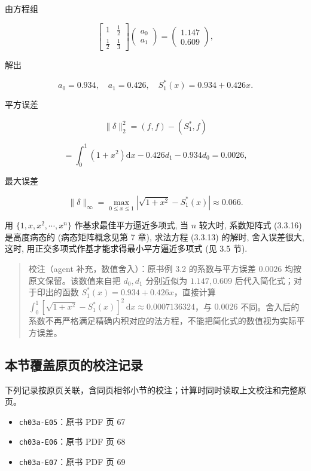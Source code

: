 \documentclass[
  10pt,
  fontset=fandol]{ctexart}
\providecommand{\tightlist}{%
  \setlength{\itemsep}{0pt}\setlength{\parskip}{0pt}}
\begin{document}
由方程组

\[
\begin{bmatrix}
1 & \frac{1}{2} \\
\frac{1}{2} & \frac{1}{3}
\end{bmatrix} \begin{pmatrix} a_0 \\ a_1 \end{pmatrix} = \begin{pmatrix} 1.147 \\ 0.609 \end{pmatrix},
\]

解出

\[
a_0 = 0.934, \quad a_1 = 0.426, \quad S_1^*(x) = 0.934 + 0.426x.
\]

平方误差

\[
\|\delta\|_2^2 = (f, f) - (S_1^*, f)
\]

\[
= \int_0^1 (1+x^2) \mathrm{d}x - 0.426 d_1 - 0.934 d_0 = 0.0026,
\]

最大误差

\[
\|\delta\|_\infty = \max_{0 \leqslant x \leqslant 1} |\sqrt{1+x^2} - S_1^*(x)| \approx 0.066.
\]

用 \(\{1, x, x^2, \cdots, x^n\}\) 作基求最佳平方逼近多项式, 当 \(n\) 较大时, 系数矩阵式 (3.3.16) 是高度病态的 (病态矩阵概念见第 7 章), 求法方程 (3.3.13) 的解时, 舍入误差很大, 这时, 用正交多项式作基才能求得最小平方逼近多项式 (见 3.5 节).

\begin{quote}
校注（agent 补充，数值舍入）：原书例 3.2 的系数与平方误差 \(0.0026\) 均按原文保留。该数值来自把 \(d_0,d_1\) 分别近似为 \(1.147,0.609\) 后代入简化式；对于印出的函数 \(S_1^*(x)=0.934+0.426x\)，直接计算 \(\int_0^1[\sqrt{1+x^2}-S_1^*(x)]^2\,\mathrm{d}x\approx0.0007136324\)，与 \(0.0026\) 不同。舍入后的系数不再严格满足精确内积对应的法方程，不能把简化式的数值视为实际平方误差。
\end{quote}

\subsection{本节覆盖原页的校注记录}\label{ux672cux8282ux8986ux76d6ux539fux9875ux7684ux6821ux6ce8ux8bb0ux5f55}

下列记录按原页关联，含同页相邻小节的校注；计算时同时读取上文校注和完整原页。

\begin{itemize}
\tightlist
\item
  \texttt{ch03a-E05}：原书 PDF 页 67
\item
  \texttt{ch03a-E06}：原书 PDF 页 68
\item
  \texttt{ch03a-E07}：原书 PDF 页 69
\end{itemize}
\end{document}
